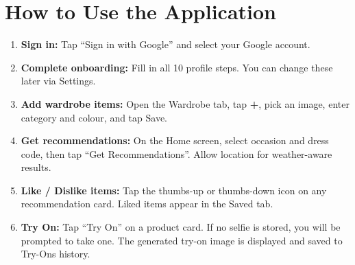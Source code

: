 \documentclass[12pt,a4paper]{report}
\begin{document}
\section{How to Use the Application}

\begin{enumerate}
  \item \textbf{Sign in:} Tap ``Sign in with Google'' and select your Google account.
  \item \textbf{Complete onboarding:} Fill in all 10 profile steps. You can change these later via Settings.
  \item \textbf{Add wardrobe items:} Open the Wardrobe tab, tap \textbf{+}, pick an image, enter category and colour, and tap Save.
  \item \textbf{Get recommendations:} On the Home screen, select occasion and dress code, then tap ``Get Recommendations''. Allow location for weather-aware results.
  \item \textbf{Like / Dislike items:} Tap the thumbs-up or thumbs-down icon on any recommendation card. Liked items appear in the Saved tab.
  \item \textbf{Try On:} Tap ``Try On'' on a product card. If no selfie is stored, you will be prompted to take one. The generated try-on image is displayed and saved to Try-Ons history.
\end{enumerate}
\end{document}
